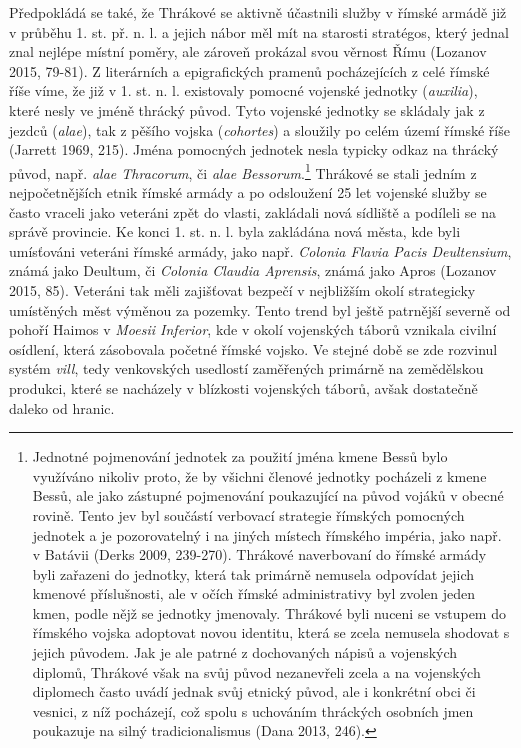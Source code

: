 Předpokládá se také, že Thrákové se aktivně účastnili služby v římské armádě již v průběhu 1. st. př. n. l. a jejich nábor měl mít na starosti stratégos, který jednal znal nejlépe místní poměry, ale zároveň prokázal svou věrnost Římu (Lozanov 2015, 79-81). Z literárních a epigrafických pramenů pocházejících z celé římské říše víme, že již v 1. st. n. l. existovaly pomocné vojenské jednotky ({\em auxilia}), které nesly ve jméně thrácký původ. Tyto vojenské jednotky se skládaly jak z jezdců ({\em alae}), tak z pěšího vojska ({\em cohortes}) a sloužily po celém území římské říše (Jarrett 1969, 215). Jména pomocných jednotek nesla typicky odkaz na thrácký původ, např. {\em alae Thracorum}, či {\em alae Bessorum}.\footnote{Jednotné pojmenování jednotek za použití jména kmene Bessů bylo využíváno nikoliv proto, že by všichni členové jednotky pocházeli z kmene Bessů, ale jako zástupné pojmenování poukazující na původ vojáků v obecné rovině. Tento jev byl součástí verbovací strategie římských pomocných jednotek a je pozorovatelný i na jiných místech římského impéria, jako např. v Batávii (Derks 2009, 239-270). Thrákové naverbovaní do římské armády byli zařazeni do jednotky, která tak primárně nemusela odpovídat jejich kmenové příslušnosti, ale v očích římské administrativy byl zvolen jeden kmen, podle nějž se jednotky jmenovaly. Thrákové byli nuceni se vstupem do římského vojska adoptovat novou identitu, která se zcela nemusela shodovat s jejich původem. Jak je ale patrné z dochovaných nápisů a vojenských diplomů, Thrákové však na svůj původ nezanevřeli zcela a na vojenských diplomech často uvádí jednak svůj etnický původ, ale i konkrétní obci či vesnici, z níž pocházejí, což spolu s uchováním thráckých osobních jmen poukazuje na silný tradicionalismus (Dana 2013, 246).} Thrákové se stali jedním z nejpočetnějších etnik římské armády a po odsloužení 25 let vojenské služby se často vraceli jako veteráni zpět do vlasti, zakládali nová sídliště a podíleli se na správě provincie. Ke konci 1. st. n. l. byla zakládána nová města, kde byli umísťováni veteráni římské armády, jako např. {\em Colonia Flavia Pacis Deultensium}, známá jako Deultum, či {\em Colonia Claudia Aprensis}, známá jako Apros (Lozanov 2015, 85). Veteráni tak měli zajišťovat bezpečí v nejbližším okolí strategicky umístěných měst výměnou za pozemky. Tento trend byl ještě patrnější severně od pohoří Haimos v {\em Moesii Inferior}, kde v okolí vojenských táborů vznikala civilní osídlení, která zásobovala početné římské vojsko. Ve stejné době se zde rozvinul systém {\em vill}, tedy venkovských usedlostí zaměřených primárně na zemědělskou produkci, které se nacházely v blízkosti vojenských táborů, avšak dostatečně daleko od hranic.


